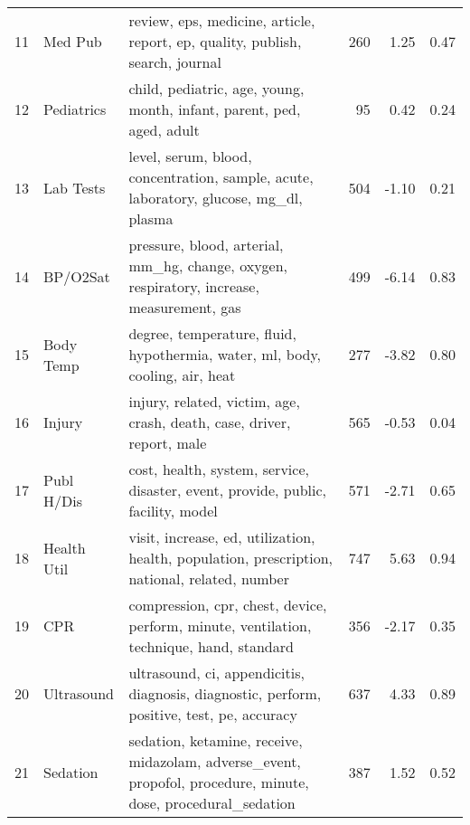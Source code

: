 \begin{tabular}{rllrrr}
    11 &       Med Pub &                                                review, eps, medicine, article, report, ep, quality, publish, search, journal &             260 &              1.25 &  0.47 \\
    12 &    Pediatrics &                                                        child, pediatric, age, young, month, infant, parent, ped, aged, adult &              95 &              0.42 &  0.24 \\
    13 &     Lab Tests &                                        level, serum, blood, concentration, sample, acute, laboratory, glucose, mg\_dl, plasma &             504 &             -1.10 &  0.21 \\
    14 &      BP/O2Sat &                                    pressure, blood, arterial, mm\_hg, change, oxygen, respiratory, increase, measurement, gas &             499 &             -6.14 &  0.83 \\
    15 &     Body Temp &                                                 degree, temperature, fluid, hypothermia, water, ml, body, cooling, air, heat &             277 &             -3.82 &  0.80 \\
    16 &        Injury &                                                       injury, related, victim, age, crash, death, case, driver, report, male &             565 &             -0.53 &  0.04 \\
    17 &    Publ H/Dis &                                             cost, health, system, service, disaster, event, provide, public, facility, model &             571 &             -2.71 &  0.65 \\
    18 &   Health Util &                                visit, increase, ed, utilization, health, population, prescription, national, related, number &             747 &              5.63 &  0.94 \\
    19 &           CPR &                                     compression, cpr, chest, device, perform, minute, ventilation, technique, hand, standard &             356 &             -2.17 &  0.35 \\
    20 &    Ultrasound &                                   ultrasound, ci, appendicitis, diagnosis, diagnostic, perform, positive, test, pe, accuracy &             637 &              4.33 &  0.89 \\
    21 &      Sedation &                sedation, ketamine, receive, midazolam, adverse\_event, propofol, procedure, minute, dose, procedural\_sedation &             387 &              1.52 &  0.52 \\

\end{tabular}
